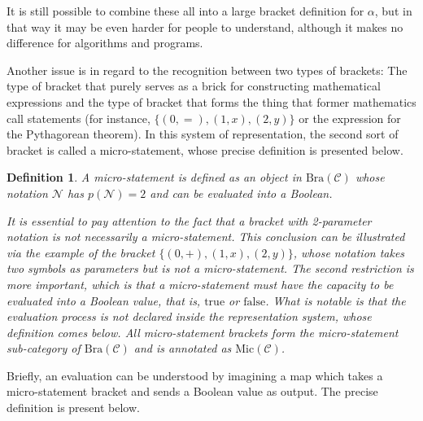 \documentclass{aims}
\numberwithin{equation}{section}
\newtheorem{definition}{Definition}	%
\numberwithin{theorem}{section}	%
\numberwithin{axiom}{section}	%
\numberwithin{definition}{section}	%
\begin{document}
	It is still possible to combine these all into a large bracket definition for \(\alpha\), but in that way it may be even harder for people to understand, although it makes no difference for algorithms and programs.
	
	Another issue is in regard to the recognition between two types of brackets: The type of bracket that purely serves as a brick for constructing mathematical expressions and the type of bracket that forms the thing that former mathematics call statements (for instance, \(\{(0,=),(1,x),(2,y)\}\) or the expression for the Pythagorean theorem). In this system of representation, the second sort of bracket is called a{ micro-statement}, whose precise definition is presented below.
	
	\begin{definition}
		A micro-statement is defined as an object in \(\text{Bra}(\mathcal{C})\) whose notation \(\mathcal{N}\) has \(\mathit{p}(\mathcal{N})=2\) and can be evaluated into a Boolean.
		
		It is essential to pay attention to the fact that a bracket with 2-parameter notation is not necessarily a micro-statement. This conclusion can be illustrated via the example of the bracket  \(\{(0,+),(1,x),(2,y)\}\),  whose notation takes two symbols as parameters but is not a micro-statement. The second restriction is more important, which is that a micro-statement must have the capacity to be evaluated into a Boolean value, that is, \(\text{true}\) or \(\text{false}\). What is notable is that the{ evaluation} process is not declared inside the representation system, whose definition comes below. All micro-statement brackets form the{ micro-statement }sub-category of \(\text{Bra}(\mathcal{C})\) and is annotated as \(\text{Mic}(\mathcal{C})\).
	\end{definition}
	
	Briefly, an evaluation can be understood by imagining a map which takes a micro-statement bracket and sends a Boolean value as output. The precise definition is present below.
	
\end{document}
